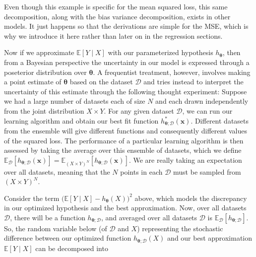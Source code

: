 \documentclass{article}
\theoremstyle{definition}
\begin{document}
      Even though this example is specific for the mean squared loss, this same decomposition, along with the bias variance decomposition, exists in other models. It just happens so that the derivations are simple for the MSE, which is why we introduce it here rather than later on in the regression sections. 

      Now if we approximate $\mathbb{E}[Y \mid X]$ with our parameterized hypothesis $h_{\boldsymbol{\theta}}$, then from a Bayesian perspective the uncertainty in our model is expressed through a poseterior distribution over ${\boldsymbol{\theta}}$. A frequentist treatment, however, involves making a point estimate of ${\boldsymbol{\theta}}$ based on the dataset $\mathcal{D}$ and tries instead to interpret the uncertainty of this estimate through the following thought experiment: Suppose we had a large number of datasets each of size $N$ and each drawn independently from the joint distribution $X \times Y$. For any given dataset $\mathcal{D}$, we can run our learning algorithm and obtain our best fit function $h_{{\boldsymbol{\theta}}; \mathcal{D}}^\ast (\mathbf{x})$. Different datasets from the ensemble will give different functions and consequently different values of the squared loss. The performance of a particular learning algorithm is then assessed by taking the average over this ensemble of datasets, which we define $\mathbb{E}_\mathcal{D} [h_{{\boldsymbol{\theta}}; \mathcal{D}} (\mathbf{x})] = \mathbb{E}_{(X \times Y)^N} [h_{{\boldsymbol{\theta}}; \mathcal{D}} (\mathbf{x})]$. We are really taking an expectation over all datasets, meaning that the $N$ points in each $\mathcal{D}$ must be sampled from $(X \times Y)^N$. 

      Consider the term $\big(\mathbb{E}[Y \mid X] - h_{\boldsymbol{\theta}}(X) \big)^2$ above, which models the discrepancy in our optimized hypothesis and the best approximation. Now, over all datasets $\mathcal{D}$, there will be a function $h_{{\boldsymbol{\theta}}; \mathcal{D}}$, and averaged over all datasets $\mathcal{D}$ is $\mathbb{E}_\mathcal{D} [ h_{{\boldsymbol{\theta}}; \mathcal{D}}]$. So, the random variable below (of $\mathcal{D}$ and $X$) representing the stochastic difference between our optimized function $h_{{\boldsymbol{\theta}}; \mathcal{D}} (X)$ and our best approximation $\mathbb{E}[Y\mid X]$ can be decomposed into 
\end{document}
